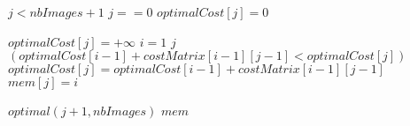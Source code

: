 
\begin{codebox}
\li \If $j < nbImages + 1$
	\Do
	\li \If $j == 0$
		\Do
		\li $optimalCost[j] = 0$
	\li \Else
		
		\li $optimalCost[j] = + \infty$
		\li \For $i = 1$ \To $j$
		\Do
			\li \If $(optimalCost[i - 1] + costMatrix[i - 1][j - 1] < optimalCost[j])$
			\Do
				\li $optimalCost[j] = optimalCost[i - 1] + costMatrix[i - 1][j - 1]$
				\li $mem[j] = i$
				
			\End
		\End \End
	\li $optimal(j + 1, nbImages)$
	\End
\li \Return $mem$
	
\end{codebox}
